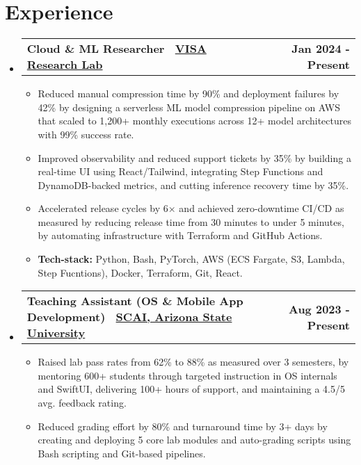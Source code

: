\documentclass[a4paper, 10pt]{article}
\makeatletter
\newcommand{\resumeExperienceHeading}[2]{
    \item
    \begin{tabular*}{\textwidth}[t]{l@{\extracolsep{\fill}}r}
    \textbf{#1} & \textbf{#2}
    \end{tabular*}
    \vspace{-15pt}
}
\makeatother
\begin{document}
\section{Experience}
    \vspace{-5pt}
    \begin{itemize}[itemsep=1pt,leftmargin=0in, label={}]
        \resumeExperienceHeading{Cloud \& ML Researcher \textbar\ \href{https://visa.lab.asu.edu/}{VISA Research Lab}}{Jan 2024 - Present}
        \begin{itemize}[itemsep=1pt]
            \item Reduced manual compression time by 90\% and deployment failures by 42\% by designing a serverless ML model compression pipeline on AWS that scaled to 1,200+ monthly executions across 12+ model architectures with 99\% success rate.       
            
            \item Improved observability and reduced support tickets by 35\% by building a real-time UI using React/Tailwind, integrating Step Functions and DynamoDB-backed metrics, and cutting inference recovery time by 35\%.
            
            \item Accelerated release cycles by 6× and achieved zero-downtime CI/CD as measured by reducing release time from 30 minutes to under 5 minutes, by automating infrastructure with Terraform and GitHub Actions.
            
            \item \textbf{Tech-stack:} Python, Bash, PyTorch, AWS (ECS Fargate, S3, Lambda, Step Fucntions), Docker, Terraform, Git, React.
        \end{itemize}
        \vspace{-5pt}

        \resumeExperienceHeading{Teaching Assistant (OS \& Mobile App Development) \textbar\ \href{https://scai.engineering.asu.edu/}{SCAI, Arizona State University}}{Aug 2023 - Present}
        \begin{itemize}[itemsep=1pt]
            \item Raised lab pass rates from 62\% to 88\% as measured over 3 semesters, by mentoring 600+ students through targeted instruction in OS internals and SwiftUI, delivering 100+ hours of support, and maintaining a 4.5/5 avg. feedback rating.
            
            \item Reduced grading effort by 80\% and turnaround time by 3+ days by creating and deploying 5 core lab modules and auto-grading scripts using Bash scripting and Git-based pipelines.
            

\end{itemize}
\end{itemize}
\end{document}

